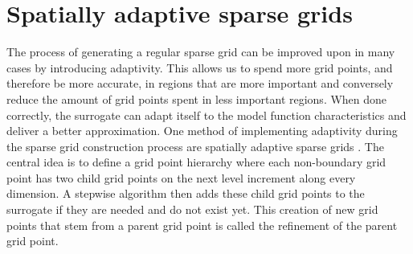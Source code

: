 \documentclass[
  a4paper,  %
  twoside,  %
  bibliography=totoc,
  headsepline,
  cleardoublepage=empty,
  parskip=half,
  draft=false
]{scrbook}
\begin{document}
\section{Spatially adaptive sparse grids}

The process of generating a regular sparse grid can be improved upon in many cases by introducing adaptivity.
This allows us to spend more grid points, and therefore be more accurate, in regions that are more important and conversely reduce the amount of grid points spent in less important regions.
When done correctly, the surrogate can adapt itself to the model function characteristics and deliver a better approximation.
One method of implementing adaptivity during the sparse grid construction process are spatially adaptive sparse grids \cite{Pflueger2012}.
The central idea is to define a grid point hierarchy where each non-boundary grid point has two child grid points on the next level increment along every dimension.
A stepwise algorithm then adds these child grid points to the surrogate if they are needed and do not exist yet.
This creation of new grid points that stem from a parent grid point is called the refinement of the parent grid point.
\end{document}
